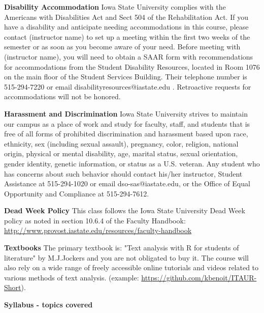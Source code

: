 \documentclass[11pt,a4paper]{article}
\begin{document}
\bigskip\textbf{\large Disability Accommodation}
Iowa State University complies with the Americans with Disabilities Act and Sect 504 of the Rehabilitation Act. If you have a disability and anticipate needing accommodations in this course, please contact (instructor name) to set up a meeting within the first two weeks of the semester or as soon as you become aware of your need.  Before meeting with (instructor name), you will need to obtain a SAAR form with recommendations for accommodations from the Student Disability Resources, located in Room 1076 on the main floor of the Student Services Building. Their telephone number is 515-294-7220 or email disabilityresources@iastate.edu .  Retroactive requests for accommodations will not be honored.

\bigskip\textbf{\large Harassment and Discrimination}
Iowa State University strives to maintain our campus as a place of work and study for faculty, staff, and students that is free of all forms of prohibited discrimination and harassment based upon race, ethnicity, sex (including sexual assault), pregnancy, color, religion, national origin, physical or mental disability, age, marital status, sexual orientation, gender identity, genetic information, or status as a U.S. veteran. Any student who has concerns about such behavior should contact his/her instructor, Student Assistance at 515-294-1020 or email dso-sas@iastate.edu, or the Office of Equal Opportunity and Compliance at 515-294-7612.

\bigskip\textbf{\large Dead Week Policy}
This class follows the Iowa State University Dead Week policy as noted in section 10.6.4 of the Faculty Handbook: \url{http://www.provost.iastate.edu/resources/faculty-handbook}

\bigskip\textbf{\large Textbooks}
The primary textbook is: "Text analysis with R for students of literature" by M.J.Jockers and you are not obligated to buy it. The course will also rely on a wide range of freely accessible online tutorials and videos related to various methods of text analysis. (example: \url{https://github.com/kbenoit/ITAUR-Short}).

\bigskip \bigskip \textbf{\large Syllabus - topics covered}
\end{document}
